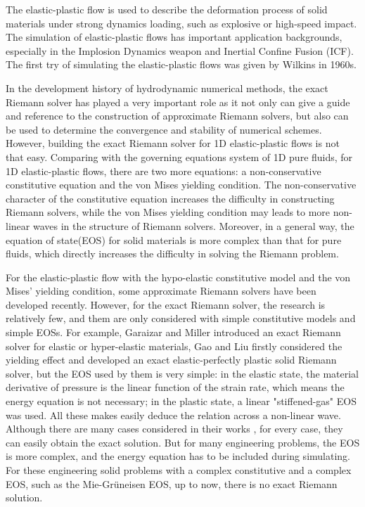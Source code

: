 \documentclass{article}
\numberwithin{equation}{section}
\numberwithin{table}{section}
\begin{document}
The  elastic-plastic flow  is  used to describe the deformation process of solid materials under strong dynamics loading, such as explosive or high-speed impact. The simulation of elastic-plastic flows has important application backgrounds, especially in the Implosion Dynamics weapon and Inertial Confine Fusion (ICF). The first try of simulating the elastic-plastic flows was given by  Wilkins \cite{wilkins1963calculation} in 1960s.

In the development history of hydrodynamic numerical methods, the exact Riemann solver has played a very important role {\color{red}as} it not only can give a guide and reference to the construction of approximate Riemann solvers, but also can be used to determine {\color{red}the convergence and stability of numerical schemes}. However, building the exact Riemann solver for 1D elastic-plastic flows is not that easy. Comparing with the governing equations system of 1D pure fluids, for 1D elastic-plastic flows, there are two more equations: a non-conservative constitutive equation and the von Mises yielding condition.  The non-conservative character of the constitutive equation increases the difficulty in constructing  Riemann solvers, while the von Mises yielding condition may leads to more non-linear waves in the structure of Riemann solvers. Moreover, in a general way, the equation of state(EOS) for solid materials is more complex than that for pure fluids, which directly increases the difficulty in solving the Riemann problem.

For the elastic-plastic flow with the hypo-elastic constitutive model and  the von Mises' yielding condition,  some approximate Riemann solvers\cite{gavrilyuk2008modelling,cheng2015high,cheng2016harten,liumulti}  {\color{red}have been developed recently. However, for the exact Riemann solver, the research is relatively few, and them are only considered with  simple constitutive models and simple EOSs.} For example, Garaizar \cite{garaizar1991solution} and Miller \cite{miller2004iterative} introduced  an exact Riemann solver for elastic or hyper-elastic materials, Gao and Liu \cite{gao20171d,gao2018complete} firstly considered the yielding effect and developed an exact elastic-perfectly plastic solid Riemann solver, but the EOS used by them is very simple: in the elastic state, the material derivative of pressure is the linear function of the strain rate, which means the energy equation is not necessary; in the plastic state,  a linear  "stiffened-gas" EOS was used. All these makes easily deduce the relation across a non-linear wave. Although there are many  cases considered in their works \cite{gao20171d,gao2018complete}, for every case, they can easily obtain the exact solution. But for many engineering problems, the EOS is more complex, and the energy equation has to be included during simulating. For these engineering solid problems with a complex constitutive and a complex EOS, such as the Mie-Gr\"uneisen EOS, up to now, there is no  exact Riemann solution.
\end{document}
